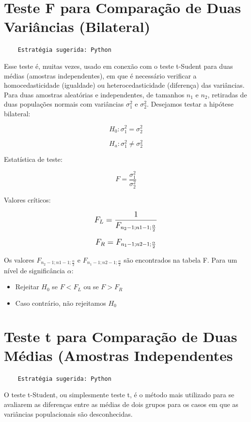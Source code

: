 \section{Teste F para Comparação de Duas Variâncias (Bilateral)}

\begin{verbatim}
	Estratégia sugerida: Python 
\end{verbatim}

Esse teste é, muitas vezes, usado em conexão com o teste t-Sudent para duas médias (amostras
independentes), em que é necessário verificar a homocedasticidade (igualdade) ou
heterocedasticidade (diferença) das variâncias. Para duas amostras aleatórias e independentes, de tamanhos \(n_1\) e \(n_2\), retiradas de duas populações normais com variâncias \(\sigma_1^2\) e
\(\sigma_2^2\). Desejamos testar a hipótese bilateral: 

\[H_0: \sigma_1^2 = \sigma_2^2\]

\[H_a: \sigma_1^2 \neq \sigma_2^2\]

Estatística de teste:

\[ F = \frac{\sigma_1^2}{\sigma_2^2} \]

Valores críticos:

\[\beq{ F_L = \frac{1}{F_{n_2-1;n1-1;\frac{\alpha}{2}}} }\]

\[\beq{ F_R = F_{n_1-1;n2-1;\frac{\alpha}{2}} }\]

Os valores \( F_{n_2-1;n1-1;\frac{\alpha}{2}} \) e \(F_{n_1-1;n2-1;\frac{\alpha}{2}}\) são encontrados na  tabela F. Para um nível de significância \(\alpha\):
\begin{itemize}
	\item Rejeitar \(H_0\) se \(F < F_L\) ou se \(F>F_R\)
	\item Caso contrário, não rejeitamos \(H_0\)
\end{itemize}

\section{Teste t para Comparação de Duas Médias (Amostras Independentes}

\begin{verbatim}
	Estratégia sugerida: Python
\end{verbatim}

O teste t-Student, ou simplesmente teste t, é o método mais utilizado para se avaliarem as diferenças entre as médias de dois grupos para os casos em que as variâncias populacionais são desconhecidas.


